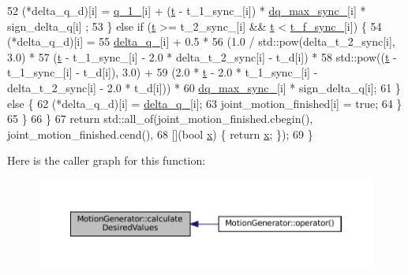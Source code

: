 \begin{DoxyCode}
52         (*delta\_q\_d)[i] = \hyperlink{classMotionGenerator_a9e8620af632e541116e9b5e219f1ccbd}{q\_1\_}[i] + (\hyperlink{namespacebattery__monitor__node_a7a63d20d1ea461e280f4eb5b47f925cd}{t} - t\_1\_sync\_[i]) * \hyperlink{classMotionGenerator_a4924578b9275d362c015b16f80232263}{dq\_max\_sync\_}[i] * sign\_delta\_q[i]
      ;
53       \} \textcolor{keywordflow}{else} \textcolor{keywordflow}{if} (\hyperlink{namespacebattery__monitor__node_a7a63d20d1ea461e280f4eb5b47f925cd}{t} >= t\_2\_sync\_[i] && \hyperlink{namespacebattery__monitor__node_a7a63d20d1ea461e280f4eb5b47f925cd}{t} < \hyperlink{classMotionGenerator_a7119bd48c0d8b0f838a3a81e8f52a8b2}{t\_f\_sync\_}[i]) \{
54         (*delta\_q\_d)[i] =
55             \hyperlink{classMotionGenerator_a943798bdc9c985f66548c59d562fd8b7}{delta\_q\_}[i] + 0.5 *
56                               (1.0 / std::pow(delta\_t\_2\_sync[i], 3.0) *
57                                    (\hyperlink{namespacebattery__monitor__node_a7a63d20d1ea461e280f4eb5b47f925cd}{t} - t\_1\_sync\_[i] - 2.0 * delta\_t\_2\_sync[i] - t\_d[i]) *
58                                    std::pow((\hyperlink{namespacebattery__monitor__node_a7a63d20d1ea461e280f4eb5b47f925cd}{t} - t\_1\_sync\_[i] - t\_d[i]), 3.0) +
59                                (2.0 * \hyperlink{namespacebattery__monitor__node_a7a63d20d1ea461e280f4eb5b47f925cd}{t} - 2.0 * t\_1\_sync\_[i] - delta\_t\_2\_sync[i] - 2.0 * t\_d[i])) *
60                               \hyperlink{classMotionGenerator_a4924578b9275d362c015b16f80232263}{dq\_max\_sync\_}[i] * sign\_delta\_q[i];
61       \} \textcolor{keywordflow}{else} \{
62         (*delta\_q\_d)[i] = \hyperlink{classMotionGenerator_a943798bdc9c985f66548c59d562fd8b7}{delta\_q\_}[i];
63         joint\_motion\_finished[i] = \textcolor{keyword}{true};
64       \}
65     \}
66   \}
67   \textcolor{keywordflow}{return} std::all\_of(joint\_motion\_finished.cbegin(), joint\_motion\_finished.cend(),
68                      [](\textcolor{keywordtype}{bool} \hyperlink{namespaceinteractive__marker_acda52804aef30b460a72fb21ee01d69d}{x}) \{ \textcolor{keywordflow}{return} \hyperlink{namespaceinteractive__marker_acda52804aef30b460a72fb21ee01d69d}{x}; \});
69 \}
\end{DoxyCode}
Here is the caller graph for this function\+:
\nopagebreak
\begin{figure}[H]
\begin{center}
\leavevmode
\includegraphics[width=350pt]{classMotionGenerator_a7d436455ec33c3cbe8427b6d8611c83f_icgraph}
\end{center}
\end{figure}
\mbox{\label{classMotionGenerator_aa366f6b1183f1c0f8c4fb745d7a927d2}} 
